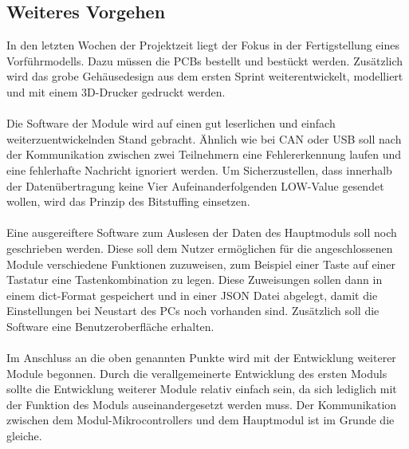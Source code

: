 \subsection{Weiteres Vorgehen}
In den letzten Wochen der Projektzeit liegt der Fokus in der Fertigstellung eines Vorführmodells. Dazu müssen die PCBs bestellt und bestückt werden. Zusätzlich wird das grobe Gehäusedesign aus dem ersten Sprint weiterentwickelt, modelliert und mit einem 3D-Drucker gedruckt werden. \\\\
Die Software der Module wird auf einen gut leserlichen und einfach weiterzuentwickelnden Stand gebracht. Ähnlich wie bei CAN oder USB soll nach der Kommunikation zwischen zwei Teilnehmern eine Fehlererkennung laufen und eine fehlerhafte Nachricht ignoriert werden. Um Sicherzustellen, dass innerhalb der Datenübertragung keine Vier Aufeinanderfolgenden LOW-Value gesendet wollen, wird das Prinzip des Bitstuffing einsetzen.  \\\\
Eine ausgereiftere Software zum Auslesen der Daten des Hauptmoduls soll noch geschrieben werden. Diese soll dem Nutzer ermöglichen für die angeschlossenen Module verschiedene Funktionen zuzuweisen, zum Beispiel einer Taste auf einer Tastatur eine Tastenkombination zu legen. Diese Zuweisungen sollen dann in einem dict-Format gespeichert und in einer JSON Datei abgelegt, damit die Einstellungen bei Neustart des PCs noch vorhanden sind. Zusätzlich soll die Software eine Benutzeroberfläche erhalten. \\\\
Im Anschluss an die oben genannten Punkte wird mit der Entwicklung weiterer Module begonnen. Durch die verallgemeinerte Entwicklung des ersten Moduls sollte die Entwicklung weiterer Module relativ einfach sein, da sich lediglich mit der Funktion des Moduls auseinandergesetzt werden muss. Der Kommunikation zwischen dem Modul-Mikrocontrollers und dem Hauptmodul ist im Grunde die gleiche.
